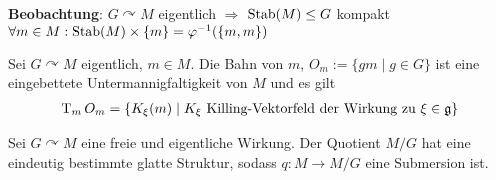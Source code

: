 \textbf{Beobachtung}: $G\curvearrowright M$ eigentlich $\Rightarrow$ $\operatorname{Stab}(M)\le G$ kompakt $\forall m\in M: \operatorname{Stab}(M) \times\{m\}= \varphi^{-1}(\{m,m\})$

\begin{proposition}
	Sei $G\curvearrowright M$ eigentlich, $m\in M$. Die Bahn von $m$, $O_m := \{gm\mid g\in G\}$ ist eine eingebettete Untermannigfaltigkeit von $M$ und es gilt \begin{align*}
		\operatorname{T}_m O_m = \{ K_\xi(m)\mid \text{$K_\xi$ Killing-Vektorfeld der Wirkung zu $\xi\in\mathfrak g$} \}
	\end{align*}
\end{proposition}

\begin{proposition}
	Sei $G\curvearrowright M$ eine freie und eigentliche Wirkung. Der Quotient $M\slash G$ hat eine eindeutig bestimmte glatte Struktur, sodass $q\colon M\to M\slash G$ eine Submersion ist.
\end{proposition}
